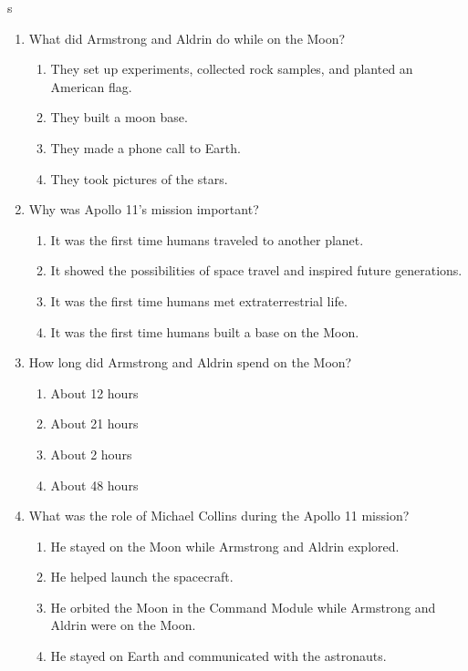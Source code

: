 s\documentclass[12pt]{article}
\begin{document}
\begin{enumerate}
    \item What did Armstrong and Aldrin do while on the Moon?
    \begin{enumerate}[label=\Alph*.]
        \item They set up experiments, collected rock samples, and planted an American flag.
        \item They built a moon base.
        \item They made a phone call to Earth.
        \item They took pictures of the stars.
    \end{enumerate}
    \vspace{0.5cm}

    \item Why was Apollo 11's mission important?
    \begin{enumerate}[label=\Alph*.]
        \item It was the first time humans traveled to another planet.
        \item It showed the possibilities of space travel and inspired future generations.
        \item It was the first time humans met extraterrestrial life.
        \item It was the first time humans built a base on the Moon.
    \end{enumerate}
    \vspace{0.5cm}

    \item How long did Armstrong and Aldrin spend on the Moon?
    \begin{enumerate}[label=\Alph*.]
        \item About 12 hours
        \item About 21 hours
        \item About 2 hours
        \item About 48 hours
    \end{enumerate}
    \vspace{0.5cm}

    \item What was the role of Michael Collins during the Apollo 11 mission?
    \begin{enumerate}[label=\Alph*.]
        \item He stayed on the Moon while Armstrong and Aldrin explored.
        \item He helped launch the spacecraft.
        \item He orbited the Moon in the Command Module while Armstrong and Aldrin were on the Moon.
        \item He stayed on Earth and communicated with the astronauts.
    \end{enumerate}
    \vspace{0.5cm}


\end{enumerate}
\end{document}
